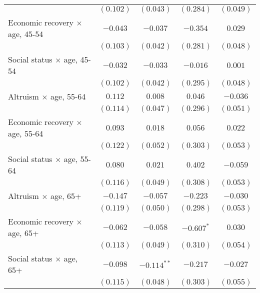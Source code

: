 \begin{table}
\begin{center}
\begin{tabular}{l c c c c}
                                                    & $(0.102)$      & $(0.043)$     & $(0.284)$     & $(0.049)$     \\
Economic recovery $\times$ age, 45-54               & $-0.043$       & $-0.037$      & $-0.354$      & $0.029$       \\
                                                    & $(0.103)$      & $(0.042)$     & $(0.281)$     & $(0.048)$     \\
Social status $\times$ age, 45-54                   & $-0.032$       & $-0.033$      & $-0.016$      & $0.001$       \\
                                                    & $(0.102)$      & $(0.042)$     & $(0.295)$     & $(0.048)$     \\
Altruism $\times$ age, 55-64                        & $0.112$        & $0.008$       & $0.046$       & $-0.036$      \\
                                                    & $(0.114)$      & $(0.047)$     & $(0.296)$     & $(0.051)$     \\
Economic recovery $\times$ age, 55-64               & $0.093$        & $0.018$       & $0.056$       & $0.022$       \\
                                                    & $(0.122)$      & $(0.052)$     & $(0.303)$     & $(0.053)$     \\
Social status $\times$ age, 55-64                   & $0.080$        & $0.021$       & $0.402$       & $-0.059$      \\
                                                    & $(0.116)$      & $(0.049)$     & $(0.308)$     & $(0.053)$     \\
Altruism $\times$ age, 65+                          & $-0.147$       & $-0.057$      & $-0.223$      & $-0.030$      \\
                                                    & $(0.119)$      & $(0.050)$     & $(0.298)$     & $(0.053)$     \\
Economic recovery $\times$ age, 65+                 & $-0.062$       & $-0.058$      & $-0.607^{*}$  & $0.030$       \\
                                                    & $(0.113)$      & $(0.049)$     & $(0.310)$     & $(0.054)$     \\
Social status $\times$ age, 65+                     & $-0.098$       & $-0.114^{**}$ & $-0.217$      & $-0.027$      \\
                                                    & $(0.115)$      & $(0.048)$     & $(0.303)$     & $(0.055)$     \\

\end{tabular}
\end{center}
\end{table}
